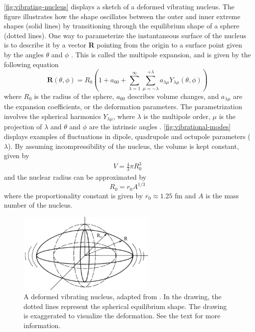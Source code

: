 \documentclass[twoside,english]{uiofysmaster/uiofysmaster}
\let\orgautoref\autoref
\renewcommand{\autoref}
        {%
		 \def\sectionautorefname{Section}%
		 \def\subsectionautorefname{Section}%
		 \def\subsubsectionautorefname{Section}%
		 \def\chapterautorefname{Chapter}%
          \orgautoref}
\begin{document}
\autoref{fig:vibrating-nucleus} displays a sketch of a deformed vibrating nucleus.
The figure illustrates how the shape oscillates between the outer and inner extreme shapes (solid lines) by transitioning through the equilibrium shape of a sphere (dotted lines). 
One way to parameterize the instantaneous surface of the nucleus is to describe it by a vector \textbf{R} pointing from the origin to a surface point given by the angles $\theta$ and $\phi$ \cite{Krane}.
This is called the multipole expansion, and is given by the following equation
\begin{equation}\label{eq:Rfull}
	\mathbf{R}(\theta, \phi) = R_0 \left( 1 + a_{00} + \sum^\infty_{\lambda = 1} \sum^{+\lambda}_{\mu = -\lambda} a_{\lambda \mu} Y_{\lambda \mu}(\theta, \phi) \right)
\end{equation}
where $R_0$ is the radius of the sphere, $a_{00}$ describes volume changes, and $a_{\lambda \mu}$ are the expansion coefficients, or the deformation parameters. 
The parametrization involves the spherical harmonics $Y_{\lambda \mu}$, where $\lambda$ is the multipole order, $\mu$ is the projection of $\lambda$ and $\theta$ and $\phi$ are the intrinsic angles \cite{Krane, RS, Klintefjord}.
\autoref{fig:vibrational-modes} displays examples of fluctuations in dipole, quadrupole and octupole parameters ($\lambda$). 
By assuming incompressibility of the nucleus, the volume is kept constant, given by
\begin{align*}
	V = \frac{4}{3} \pi R_0^3
\end{align*}
and the nuclear radius can be approximated by 
\begin{equation}\label{eq:radius}
	R_0 = r_0 A^{1/3}
\end{equation}
where the proportionality constant is given by $r_0 \approx 1.25$ fm and $A$ is the mass number of the nucleus.

\begin{figure}[ht]
	\centering
	\includegraphics[width=0.6\textwidth]{Images/vibrating-nucleus.png}
	\caption{A deformed vibrating nucleus, adapted from \cite{Krane}. 
	In the drawing, the dotted lines represent the spherical equilibrium shape. 
	The drawing is exaggerated to visualize the deformation. 
	See the text for more information.}
	\label{fig:vibrating-nucleus}
\end{figure}
\end{document}
